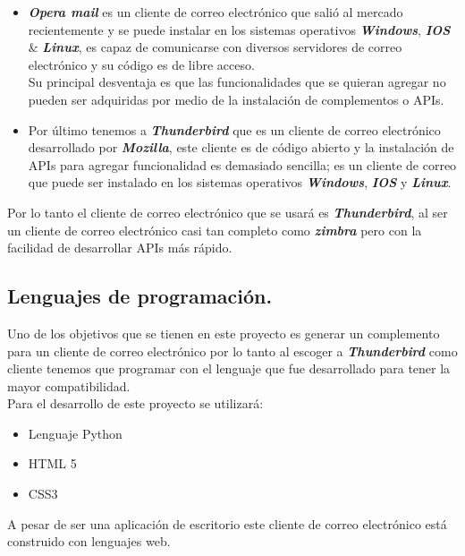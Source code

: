 \begin{itemize}
 \item \textbf{\textit{Opera mail}} es un cliente de correo electrónico que salió al mercado recientemente y se puede instalar en los sistemas operativos \textbf{\textit{Windows}}, \textbf{\textit{IOS}} \& \textbf{\textit{Linux}}, es capaz de comunicarse con diversos servidores de correo electrónico y su código es de libre acceso.\\Su principal desventaja es que las funcionalidades que se quieran agregar no pueden ser adquiridas por medio de la instalación de complementos o APIs.\cite{opera}
 \item Por último tenemos a \textbf{\textit{Thunderbird}} que es un cliente de correo electrónico desarrollado por \textbf{\textit{Mozilla}}, este cliente es de código abierto y la instalación de APIs para agregar funcionalidad es demasiado sencilla; es un cliente de correo que puede ser instalado en los sistemas operativos \textbf{\textit{Windows}}, \textbf{\textit{IOS}} y \textbf{\textit{Linux}}.\cite{thun}
\end{itemize}
Por lo tanto el cliente de correo electrónico que se usará es \textbf{\textit{Thunderbird}}, al ser un cliente de correo electrónico casi tan completo como \textbf{\textit{zimbra}} pero con la facilidad de desarrollar APIs más rápido.\\
\subsection{Lenguajes de programación.}
Uno de los objetivos que se tienen en este proyecto es generar un complemento para un cliente de correo electrónico por lo tanto al escoger a \textbf{\textit{Thunderbird}} como cliente tenemos que programar con el lenguaje que fue desarrollado para tener la mayor compatibilidad.\\Para el desarrollo de este proyecto se utilizará\cite{thun}:
\begin{itemize}
 \item Lenguaje Python
 \item HTML 5
 \item CSS3
\end{itemize}
A pesar de ser una aplicación de escritorio este cliente de correo electrónico está construido con lenguajes web.
